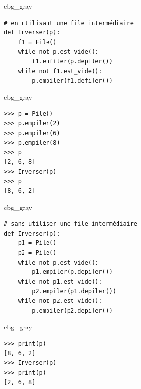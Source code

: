 \documentclass[%
oneside,                 %
final,                   %
10pt]{article}
\newenvironment{_cod_tight}[1]{
   \def\FrameCommand{\colorbox{#1}}
   \FrameRule0.6pt\MakeFramed {\FrameRestore}\vskip3mm}
   {\vskip0mm\endMakeFramed}
\newenvironment{cod}[1]{
\bgroup\rmfamily
\fboxsep=0mm\relax
\begin{_cod_tight}{#1}
\list{}{\parsep=-2mm\parskip=0mm\topsep=0pt\leftmargin=2mm
\rightmargin=2\leftmargin\leftmargin=4pt\relax}
\item\relax}
{\endlist\end{_cod_tight}\egroup}
\begin{document}
\noindent
\begin{cod}{cbg_gray}\begin{verbatim}
# en utilisant une file intermédiaire
def Inverser(p):
    f1 = File()
    while not p.est_vide():
        f1.enfiler(p.depiler())
    while not f1.est_vide():
        p.empiler(f1.defiler())
\end{verbatim}
\end{cod}
\noindent

\begin{cod}{cbg_gray}\begin{verbatim}
>>> p = Pile()
>>> p.empiler(2)
>>> p.empiler(6)
>>> p.empiler(8)
>>> p
[2, 6, 8]
>>> Inverser(p)
>>> p
[8, 6, 2]
\end{verbatim}
\end{cod}
\noindent


\begin{cod}{cbg_gray}\begin{verbatim}
# sans utiliser une file intermédiaire
def Inverser(p):
    p1 = Pile()
    p2 = Pile()
    while not p.est_vide():
        p1.empiler(p.depiler())
    while not p1.est_vide():
        p2.empiler(p1.depiler())
    while not p2.est_vide():
        p.empiler(p2.depiler())
\end{verbatim}
\end{cod}
\noindent
\begin{cod}{cbg_gray}\begin{verbatim}
>>> print(p)
[8, 6, 2]
>>> Inverser(p)
>>> print(p)
[2, 6, 8]
\end{verbatim}
\end{cod}
\noindent


\end{document}
